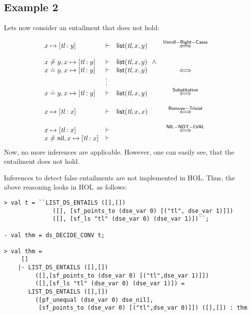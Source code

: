 \documentclass{scrartcl}
\theoremstyle{definition}
\newcommand{\HOL}{{\sf HOL}}
\newcommand{\nil}{{\textsf{nil}}}
\newcommand{\pfequal}[2]{\ensuremath{#1 \doteq #2}}
\newcommand{\pfunequal}[2]{\ensuremath{#1 \not\doteq #2}}
\newcommand{\sfpointsto}[2]{#1 \mapsto [#2]}
\newcommand{\sflist}{{\textsf{list}}}
\begin{document}
\subsection{Example 2}

Lets now consider an entailment that does not hold:


\[\begin{array}{lllc}
\sfpointsto {x} {\textit{tl}:y} & \vdash & \sflist(\textit{tl},x,y) &
\stackrel{\sf Unroll-Right-Cases}{\Longleftrightarrow} \\
\\
\pfunequal {x} {y},\sfpointsto {x} {\textit{tl}:y} & \vdash &
  \sflist(\textit{tl},x,y)\ \ \wedge  \\
\pfequal x y,\sfpointsto {x} {\textit{tl}:y} & \vdash &
  \sflist(\textit{tl},x,y) & {\Longleftrightarrow}
\\
& \vdots \\
\pfequal x y,\sfpointsto {x} {\textit{tl}:y} & \vdash &
  \sflist(\textit{tl},x,y) & {\stackrel{\sf
    Substitution}{\Longleftrightarrow}} \\ \\
\sfpointsto {x} {\textit{tl}:x} & \vdash & \sflist(\textit{tl},x,x) & {\stackrel{\sf
    Remove-Trivial}{\Longleftrightarrow}} \\ \\
\sfpointsto {x} {\textit{tl}:x} & \vdash & & {\stackrel{\sf NIL-NOT-LVAL}{\Longleftrightarrow}}\\
\pfunequal x \nil, \sfpointsto {x} {\textit{tl}:x} & \vdash &
\end{array}
\]
%
Now, no more inferences are applicable. However, one can easily see, that the
entailment does not hold.

Inferences to detect false entailments are not implemented in \HOL.
Thus, the above reasoning looks in \HOL\ as follows:
\begin{verbatim}
> val t = ``LIST_DS_ENTAILS ([],[])
              ([], [sf_points_to (dse_var 0) [("tl", dse_var 1)]])
              ([], [sf_ls "tl" (dse_var 0) (dse_var 1)])``;

- val thm = ds_DECIDE_CONV t;

> val thm =
     []
    |- LIST_DS_ENTAILS ([],[])
         ([],[sf_points_to (dse_var 0) [("tl",dse_var 1)]])
         ([],[sf_ls "tl" (dse_var 0) (dse_var 1)]) =
       LIST_DS_ENTAILS ([],[])
         ([pf_unequal (dse_var 0) dse_nil],
          [sf_points_to (dse_var 0) [("tl",dse_var 0)]]) ([],[]) : thm
\end{verbatim}
\end{document}
